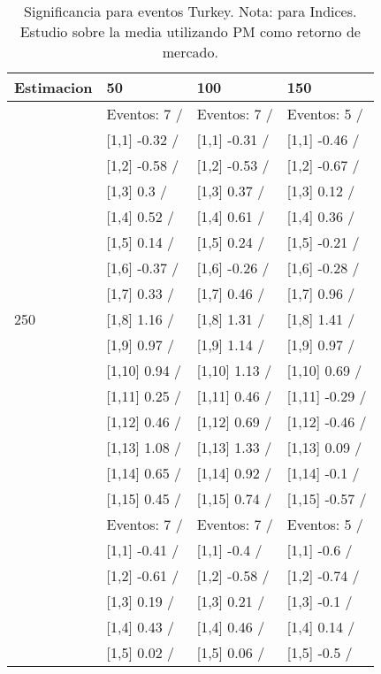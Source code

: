 \begin{table}

\caption{Significancia para eventos Turkey. Nota: para Indices. Estudio sobre la media utilizando PM como retorno de mercado.}
\centering
\begin{tabular}[t]{llll}
\toprule
Estimacion & 50 & 100 & 150\\
\midrule
 & Eventos:  7 / & Eventos:  7 / & Eventos:  5 /\\
 & {}[1,1] -0.32  / & {}[1,1] -0.31  / & {}[1,1] -0.46  /\\
 & {}[1,2] -0.58  / & {}[1,2] -0.53  / & {}[1,2] -0.67  /\\
 & {}[1,3] 0.3  / & {}[1,3] 0.37  / & {}[1,3] 0.12  /\\
 & {}[1,4] 0.52  / & {}[1,4] 0.61  / & {}[1,4] 0.36  /\\
\addlinespace
 & {}[1,5] 0.14  / & {}[1,5] 0.24  / & {}[1,5] -0.21  /\\
 & {}[1,6] -0.37  / & {}[1,6] -0.26  / & {}[1,6] -0.28  /\\
 & {}[1,7] 0.33  / & {}[1,7] 0.46  / & {}[1,7] 0.96  /\\
250 & {}[1,8] 1.16  / & {}[1,8] 1.31  / & {}[1,8] 1.41  /\\
 & {}[1,9] 0.97  / & {}[1,9] 1.14  / & {}[1,9] 0.97  /\\
\addlinespace
 & {}[1,10] 0.94  / & {}[1,10] 1.13  / & {}[1,10] 0.69  /\\
 & {}[1,11] 0.25  / & {}[1,11] 0.46  / & {}[1,11] -0.29  /\\
 & {}[1,12] 0.46  / & {}[1,12] 0.69  / & {}[1,12] -0.46  /\\
 & {}[1,13] 1.08  / & {}[1,13] 1.33  / & {}[1,13] 0.09  /\\
 & {}[1,14] 0.65  / & {}[1,14] 0.92  / & {}[1,14] -0.1  /\\
\addlinespace
 & {}[1,15] 0.45  / & {}[1,15] 0.74  / & {}[1,15] -0.57  /\\
 & Eventos:  7 / & Eventos:  7 / & Eventos:  5 /\\
 & {}[1,1] -0.41  / & {}[1,1] -0.4  / & {}[1,1] -0.6  /\\
 & {}[1,2] -0.61  / & {}[1,2] -0.58  / & {}[1,2] -0.74  /\\
 & {}[1,3] 0.19  / & {}[1,3] 0.21  / & {}[1,3] -0.1  /\\
\addlinespace
 & {}[1,4] 0.43  / & {}[1,4] 0.46  / & {}[1,4] 0.14  /\\
 & {}[1,5] 0.02  / & {}[1,5] 0.06  / & {}[1,5] -0.5  /\\

\end{tabular}
\end{table}
